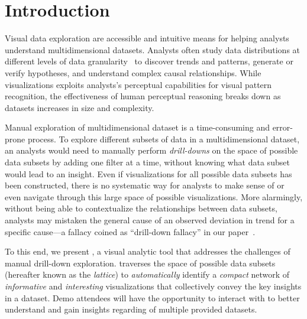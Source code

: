 \section{Introduction}
Visual data exploration are accessible and intuitive means for helping analysts understand multidimensional datasets. Analysts often study data distributions at different levels of data granularity~\cite{Anand2015,Wu2013,Heer2012} to discover trends and patterns, generate or verify hypotheses, and understand complex causal relationships. While visualizations exploits analysts's perceptual capabilities for visual pattern recognition, the effectiveness of human perceptual reasoning breaks down as datasets increases in size and complexity. 
\par Manual exploration of multidimensional dataset is a time-consuming and error-prone process. To explore different subsets of data in a multidimensional dataset, an analysts would need to manually perform \emph{drill-downs} on the space of possible data subsets by adding one filter at a time, without knowing what data subset would lead to an insight. Even if visualizations for all possible data subsets has been constructed, there is no systematic way for analysts to make sense of or even navigate through this large space of possible visualizations. More alarmingly, without being able to contextualize the relationships between data subsets, analysts may mistaken the general cause of an observed deviation in trend for a specific cause---a fallacy coined as ``drill-down fallacy'' in our paper~\cite{Lee2019}.
\par To this end, we present \vispilot, a visual analytic tool that addresses the challenges of manual drill-down exploration. \vispilot traverses the space of possible data subsets (hereafter known as the \emph{lattice}) to \emph{automatically} identify a \emph{compact} network of  \emph{informative} and  \emph{interesting} visualizations that collectively convey the key insights in a dataset. Demo attendees will have the opportunity to interact with \vispilot to better understand and gain insights regarding of multiple provided datasets.